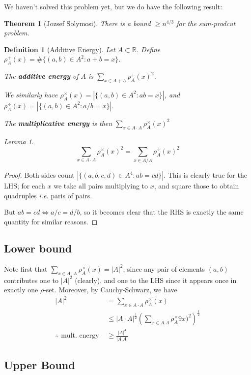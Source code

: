 \documentclass[]{article}
\theoremstyle{custhm}
\theoremstyle{cusdef}
\theoremstyle{custhm}
\theoremstyle{custhm}
\theoremstyle{custhm}
\theoremstyle{custhm}
\newtheorem*{theorem*}{Theorem}
\theoremstyle{cusdef}
\newtheorem*{defin*}{Definition}
\theoremstyle{remark}
\theoremstyle{custhm}
\newtheorem*{lemma*}{Lemma}
\newcommand{\R}{\mathbb{R}}
\newcommand{\undf}[1]{\textit{\textbf{#1}}}
\renewcommand{\it}[1]{\textit{#1}}
\begin{document}
We haven't solved this problem yet, but we do have the following result:
\begin{theorem*}[Jozsef Solymosi]
There is a bound $\ge n^{4/3}$ for the sum-prodcut problem.
\end{theorem*}
\begin{defin*}[Additive Energy]
Let $A\subset \R$. Define $\rho_A^+(x) = \#\{(a,b)\in A^2:a+b = x\}$.

The \undf{additive energy} of $A$ is $\sum_{x\in A + A}\rho_A^+(x)^2$.

We similarly have $\rho_A^\times(x) = |\{(a,b)\in A^2 : ab = x\}|$, and $\rho_A^{\div}(x) = |\{(a,b)\in A^2 : a/b = x\}|$.

The \undf{multiplicative energy} is then $\sum_{x\in A\cdot A}\rho_A^\times(x)^2$
\end{defin*}

\begin{lemma*}
\[
\sum_{x\in A\cdot A} \rho_A^\times(x)^2 = \sum_{x\in A/A} \rho_A^\div(x)^2
\]
\end{lemma*}
\begin{proof}
Both sides count $|\{(a,b,c,d)\in A^4 : ab = cd\}|$. This is clearly true for the LHS; for each $x$ we take all pairs multiplying to $x$, and square those to obtain quadruples \it{i.e.} paris of pairs.

But $ab = cd \iff a/c = d/b$, so it becomes clear that the RHS is exactly the same quantity for similar reasons.
\end{proof}

\subsection*{Lower bound}

Note first that $\sum_{x\in A\cdot A}\rho_A^\times(x) = |A|^2$, since any pair of elements $(a,b)$ contributes one to $|A|^2$ (clearly), and one to the LHS since it appears once in exactly one $\rho$-set. Moreover, by Cauchy-Schwarz, we have
\begin{align*}
	|A|^2 &= \sum_{x\in A\cdot A}\rho_A^\times(x)\\
	&\le |A\cdot A|^{\frac{1}{2}} \left(\sum_{x\in A.A}\rho_A^\times9x)^2\right)^{\frac{1}{2}}\\
	\therefore \textrm{ mult. energy }&\ge \frac{|A|^4}{|A.A|}
\end{align*}

\subsection*{Upper Bound}
\end{document}
